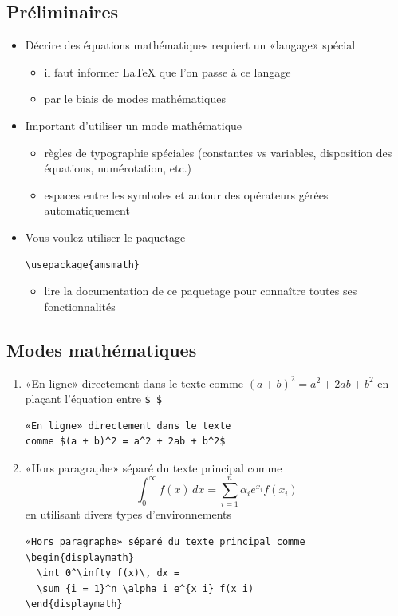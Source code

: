 \subsection{Préliminaires}

\begin{itemize}
\item Décrire des équations mathématiques requiert un «langage»
  spécial
  \begin{itemize}
  \item il faut informer {\LaTeX} que l'on passe à ce langage
  \item par le biais de modes mathématiques
  \end{itemize}
\item Important d'utiliser un mode mathématique
  \begin{itemize}
  \item règles de typographie spéciales (constantes vs variables,
    disposition des équations, numérotation, etc.)
  \item espaces entre les symboles et autour des opérateurs gérées
    automatiquement
  \end{itemize}
\item Vous voulez utiliser le paquetage 
\begin{lstlisting}
\usepackage{amsmath}
\end{lstlisting}
  \begin{itemize}
  \item lire la documentation de ce paquetage pour connaître toutes
    ses fonctionnalités
  \end{itemize}
\end{itemize}

\subsection{Modes mathématiques}

\begin{enumerate}
\item «En ligne» directement dans le texte comme
  $(a + b)^2 = a^2 + 2ab + b^2$ en plaçant l'équation entre \verb=$ $=
\begin{lstlisting}
«En ligne» directement dans le texte
comme $(a + b)^2 = a^2 + 2ab + b^2$
\end{lstlisting}
\item «Hors paragraphe» séparé du texte principal comme
  \begin{displaymath}
    \int_0^\infty f(x)\, dx = \sum_{i = 1}^n \alpha_i e^{x_i} f(x_i)
  \end{displaymath}
  en utilisant divers types d'environnements
\begin{lstlisting}
«Hors paragraphe» séparé du texte principal comme
\begin{displaymath}
  \int_0^\infty f(x)\, dx =
  \sum_{i = 1}^n \alpha_i e^{x_i} f(x_i)
\end{displaymath}
\end{lstlisting}
\end{enumerate}

